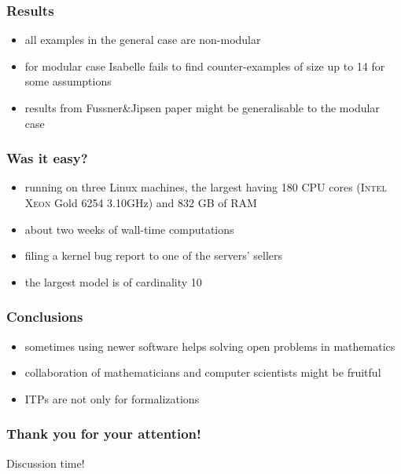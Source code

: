 \documentclass{beamer}
\begin{document}
\begin{frame}
\frametitle{Results}
\begin{itemize}
\item all examples in the general case are non-modular
\item for modular case Isabelle fails to find counter-examples of size up to 14 for some assumptions
\item results from Fussner\&Jipsen paper might be generalisable to the modular case
\end{itemize}
\end{frame}
\begin{frame}
\frametitle{Was it easy?}
\begin{itemize}
\item running on three Linux machines, the largest having 180 CPU cores (\textsc{Intel}\textsuperscript{\textregistered} \textsc{Xeon}\textsuperscript{\textregistered} Gold 6254 3.10GHz) and 832 GB of RAM
\item about two weeks of wall-time computations
\item filing a kernel bug report to one of the servers' sellers
\item the largest model is of cardinality 10
\end{itemize}
\end{frame}
\begin{frame}
\frametitle{Conclusions}
\begin{itemize}
\item sometimes using newer software helps solving open problems in mathematics
\item collaboration of mathematicians and computer scientists might be fruitful
\item ITPs are not only for formalizations
\end{itemize}
\end{frame}
\begin{frame}
\frametitle{Thank you for your attention!}
Discussion time!
\end{frame}
\end{document}

